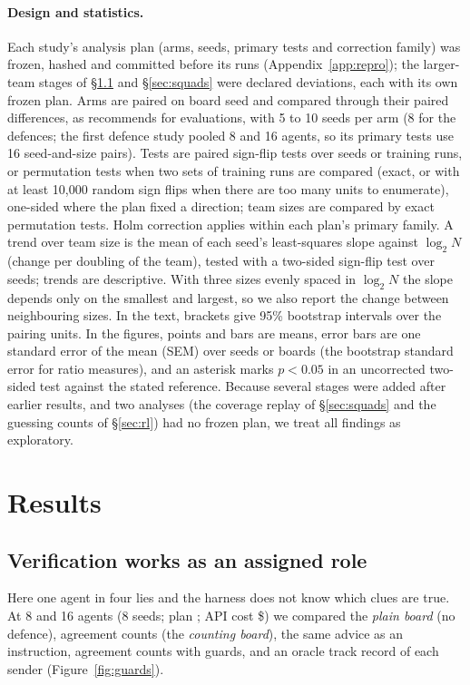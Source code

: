 \documentclass{article}
\begin{document}
\paragraph{Design and statistics.} Each study's analysis plan (arms, seeds, primary tests and correction family) was frozen, hashed and committed before its runs (Appendix~\ref{app:repro}); the larger-team stages of \S\ref{sec:colony} and \S\ref{sec:squads} were declared deviations, each with its own frozen plan. Arms are paired on board seed and compared through their paired differences, as \citet{miller2024errorbars} recommends for evaluations, with 5 to 10 seeds per arm (8 for the defences; the first defence study pooled 8 and 16 agents, so its primary tests use 16 seed-and-size pairs). Tests are paired sign-flip tests over seeds or training runs, or permutation tests when two sets of training runs are compared (exact, or with at least 10{,}000 random sign flips when there are too many units to enumerate), one-sided where the plan fixed a direction; team sizes are compared by exact permutation tests. Holm correction applies within each plan's primary family. A trend over team size is the mean of each seed's least-squares slope against $\log_2 N$ (change per doubling of the team), tested with a two-sided sign-flip test over seeds; trends are descriptive. With three sizes evenly spaced in $\log_2 N$ the slope depends only on the smallest and largest, so we also report the change between neighbouring sizes. In the text, brackets give 95\% bootstrap intervals over the pairing units. In the figures, points and bars are means, error bars are one standard error of the mean (SEM) over seeds or boards (the bootstrap standard error for ratio measures), and an asterisk marks $p < 0.05$ in an uncorrected two-sided test against the stated reference. Because several stages were added after earlier results, and two analyses (the coverage replay of \S\ref{sec:squads} and the guessing counts of \S\ref{sec:rl}) had no frozen plan, we treat all findings as exploratory.

\section{Results}

\subsection{Verification works as an assigned role}
\label{sec:colony}

Here one agent in four lies and the harness does not know which clues are true. At 8 and 16 agents (8 seeds; plan \texttt{\ColonyPlanHash}; API cost \$\ColonyCost) we compared the \emph{plain board} (no defence), agreement counts (the \emph{counting board}), the same advice as an instruction, agreement counts with guards, and an oracle track record of each sender (Figure~\ref{fig:guards}).
\end{document}

